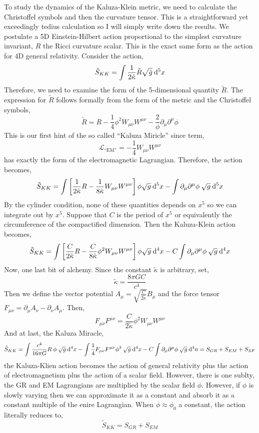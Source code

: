 \documentclass[11pt, a4paper]{article}
\begin{document}
To study the dynamics of the Kaluza-Klein metric, we need to calculate the Christoffel symbols and then the curvature tensor. This is a straightforward yet exceedingly tedius calculation so I will simply write down the results. We postulate a 5D Einstein-Hilbert action proportional to the simplest curvature invariant, $R$ the Ricci curvature scalar. This is the exact same form as the action for 4D general relativity. Consider the action,
\[ \tilde{S}_{KK} = \int \frac{1}{2 \tilde{\kappa}} \tilde{R} \sqrt{\tilde{g}} \: \mathrm{d}^{5} x\]
Therefore, we need to examine the form of the 5-dimensional quantity $\tilde{R}$. The expression for $\tilde{R}$ follows formally from the form of the metric and the Christoffel symbols,
\[ \tilde{R} = R  - \frac{1}{4} \phi^2 W_{\mu \nu} W^{\mu \nu} - \frac{2}{\phi} \partial_\mu \partial^\mu \phi \]
This is our first hint of the so called ``Kaluza Miricle'' since term,
\[ \mathcal{L}_{\text{``EM''}} = - \frac{1}{4} W_{\mu \nu} W^{\mu \nu} \] 
has exactly the form of the electromagnetic Lagrangian. Therefore, the action becomes,
\[ \tilde{S}_{KK} = \int \left[ \frac{1}{2 \tilde{\kappa}} R - \frac{1}{8 \tilde{\kappa}} W_{\mu \nu} W^{\mu \nu} \right] \phi \sqrt{g} \: \mathrm{d}^{5} x - \int \partial_\mu \partial^\mu \phi \: \sqrt{g} \: \mathrm{d}^{5} x \]
By the cylinder condition, none of these quantities depends on $x^5$ so we can integrate out by $x^5$. Suppose that $C$ is the period of $x^5$ or equivalently the circumference of the compactified dimension. Then the Kaluza-Klein action becomes,
\[ \tilde{S}_{KK} = \int \left[ \frac{C}{2 \tilde{\kappa}} R - \frac{C}{8 \tilde{\kappa}} \phi^2 W_{\mu \nu} W^{\mu \nu} \right] \phi \sqrt{g} \: \mathrm{d}^{4} x - C \int \partial_\mu \partial^\mu \phi \: \sqrt{g} \: \mathrm{d}^{4} x \]
Now, one last bit of alchemy. Since the constant $\tilde{\kappa}$ is arbitrary, set,
\[ \tilde{\kappa} = \frac{8 \pi G C}{c^4} \] 
Then we define the vector potential $A_\mu = \sqrt{\frac{C}{2 \tilde{\kappa}}} B_\mu$ and the force tensor $F_{\mu \nu} = \partial_\mu A_\nu - \partial_\nu A_\mu$. Then, 
\[ F_{\mu \nu} F^{\mu \nu} = \frac{C}{2 \tilde{\kappa}} \phi^2 W_{\mu \nu} W^{\mu \nu} \]
And at last, the Kaluza Miracle,
\[ \tilde{S}_{KK} = \int \frac{c^4}{16 \pi G} R \: \phi \: \sqrt{g} \: \mathrm{d}^{4} x - \int \frac{1}{4} F_{\mu \nu} F^{\mu \nu} \phi^3 \: \sqrt{g} \: \mathrm{d}^{4} x - C \int \partial_\mu \partial^\mu \phi \: \sqrt{g} \: \mathrm{d}^{4} n = S_{GR} + S_{EM} + S_{SF} \]
the Kaluza-Klien action becomes the action of general relativity plus the action of electromagnetism plus the action of a scalar field. However, there is one sublty, the GR and EM Lagrangians are multiplied by the scalar field $\phi$. However, if $\phi$ is slowly varying then we can approximate it as a constant and absorb it as a constant multiple of the enire Lagrangian. When $\phi \approx \phi_0$ a constant, the action literally reduces to,
\[ \tilde{S}_{KK} = S_{GR} + S_{EM} \]
\end{document}
